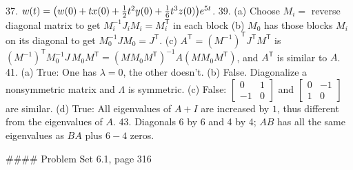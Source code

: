 37. \(w(t)=\big{(}w(0)+tx(0)+\frac{1}{2}t^{2}y(0)+\frac{1}{6}t^{3}z(0)\big{)}e^{5t}\).
39. (a) Choose \(M_{i}=\) reverse diagonal matrix to get \(M_{i}^{-1}J_{i}M_{i}=M_{i}^{\mathsf{T}}\) in each block (b) \(M_{0}\) has those blocks \(M_{i}\) on its diagonal to get \(M_{0}^{-1}JM_{0}=J^{\mathsf{T}}\). (c) \(A^{\mathsf{T}}=(M^{-1})^{\mathsf{T}}J^{\mathsf{T}}M^{\mathsf{T}}\) is \((M^{-1})^{\mathsf{T}}M_{0}^{-1}J\,M_{0}M^{\mathsf{T}}=(MM_{0}M^{\mathsf{T}})^ {-1}A(MM_{0}M^{\mathsf{T}})\), and \(A^{\mathsf{T}}\) is similar to \(A\).
41. (a) True: One has \(\lambda=0\), the other doesn't. (b) False. Diagonalize a nonsymmetric matrix and \(\Lambda\) is symmetric. (c) False: \(\begin{bmatrix}0&1\\ -1&0\end{bmatrix}\) and \(\begin{bmatrix}0&-1\\ 1&0\end{bmatrix}\) are similar. (d) True: All eigenvalues of \(A+I\) are increased by \(1\), thus different from the eigenvalues of \(A\).
43. Diagonals 6 by 6 and 4 by 4; \(AB\) has all the same eigenvalues as \(BA\) plus \(6-4\) zeros.

#### Problem Set 6.1, page 316

